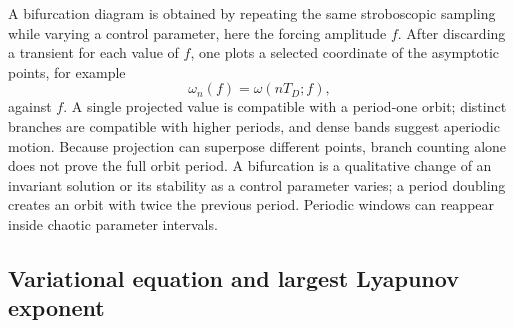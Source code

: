 \documentclass[aps,prb,reprint,floatfix]{revtex4-2}
\begin{document}
A bifurcation diagram is obtained by repeating the same stroboscopic sampling while varying a control parameter, here the forcing amplitude $f$. After discarding a transient for each value of $f$, one plots a selected coordinate of the asymptotic points, for example
\begin{equation}
 \omega_n(f)=\omega(nT_D;f),
\label{eq:bifurcation_sampling}
\end{equation}
against $f$. A single projected value is compatible with a period-one orbit; distinct branches are compatible with higher periods, and dense bands suggest aperiodic motion. Because projection can superpose different points, branch counting alone does not prove the full orbit period. A bifurcation is a qualitative change of an invariant solution or its stability as a control parameter varies; a period doubling creates an orbit with twice the previous period. Periodic windows can reappear inside chaotic parameter intervals.



\subsection{Variational equation and largest Lyapunov exponent}
\end{document}
